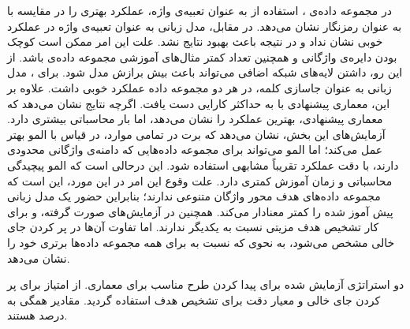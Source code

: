 در مجموعه داده‌ی ، استفاده از  به عنوان تعبیه‌ی واژه، عملکرد بهتری را در مقایسه با  به عنوان رمزنگار نشان می‌دهد. در مقابل، مدل زبانی به عنوان تعبیه‌ی واژه در  عملکرد خوبی نشان نداد و در نتیجه باعث بهبود نتایج نشد. علت این امر ممکن است کوچک بودن دایره‌ی واژگانی و همچنین تعداد کمتر مثال‌های آموزشی مجموعه‌ داده‌ی  باشد. از این رو، داشتن لایه‌های شبکه اضافی می‌تواند باعث بیش برازش مدل شود.
برای ، مدل زبانی به عنوان جاسازی کلمه، در هر دو مجموعه داده عملکرد خوبی داشت. علاوه بر این، معماری پیشنهادی با  به حداکثر کارایی دست یافت. اگرچه نتایج نشان می‌دهد که معماری پیشنهادی، بهترین عملکرد را نشان می‌دهد، اما بار محاسباتی بیشتری دارد. آزمایش‌های این بخش، نشان می‌دهد که برت در تمامی موارد، در قیاس با المو بهتر عمل می‌کند؛ اما المو می‌تواند برای مجموعه داده‌هایی که دامنه‌ی واژگانی محدودی دارند، با دقت عملکرد تقریباً مشابهی استفاده شود. این درحالی است که المو پیچیدگی محاسباتی و زمان آموزش کمتری دارد. علت وقوع این امر در این مورد، این است که مجموعه داده‌های هدف محور واژگان متنوعی ندارند؛ بنابراین حضور یک مدل زبانی پیش آموز شده را کمتر معنادار می‌کند. همچنین در آزمایش‌های صورت گرفته،   و  برای کار تشخیص هدف مزیتی نسبت به یکدیگر ندارند. اما تفاوت آن‌ها در پر کردن جای خالی مشخص می‌شود، به نحوی که  نسبت به  برای همه مجموعه داده‌ها برتری خود را نشان می‌دهد.

\begin{table}[ht]
		
	\caption[دو استراتژی آزمایش شده برای پیدا کردن طرح مناسب برای معماری]{
		دو استراتژی آزمایش شده برای پیدا کردن طرح مناسب برای معماری.  از امتیاز  برای پر کردن جای خالی و معیار دقت برای تشخیص هدف استفاده گردید. مقادیر همگی به درصد هستند.
	}
\label{Tab:strategy}
\end{table}

